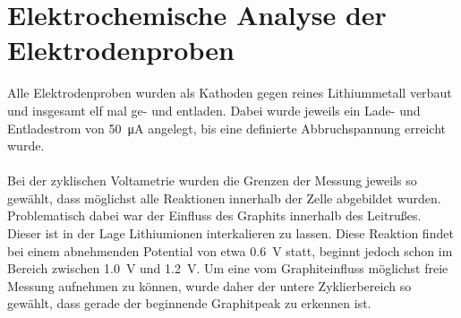 \documentclass[a4paper, 11pt, headsepline,footsepline,twoside,abstract]{scrbook}
\begin{document}
\section{Elektrochemische Analyse der Elektrodenproben}
\label{elektrochemische_analyse}
Alle Elektrodenproben wurden als Kathoden gegen reines Lithiummetall verbaut und insgesamt elf mal ge- und entladen. Dabei wurde jeweils ein Lade- und Entladestrom von \SI{50}{\micro\ampere} angelegt, bis eine definierte Abbruchspannung erreicht wurde.
\\\\
Bei der zyklischen Voltametrie wurden die Grenzen der Messung jeweils so gewählt, dass möglichst alle Reaktionen innerhalb der Zelle abgebildet wurden. Problematisch dabei war der Einfluss des Graphits innerhalb des Leitrußes. Dieser ist in der Lage Lithiumionen interkalieren zu lassen. Diese Reaktion findet bei einem abnehmenden Potential von etwa \SI{0.6}{\volt} statt, beginnt jedoch schon im Bereich zwischen \SI{1.0}{\volt} und \SI{1.2}{\volt}. Um eine vom Graphiteinfluss möglichst freie Messung aufnehmen zu können, wurde daher der untere Zyklierbereich so gewählt, dass gerade der beginnende Graphitpeak zu erkennen ist.
\end{document}
